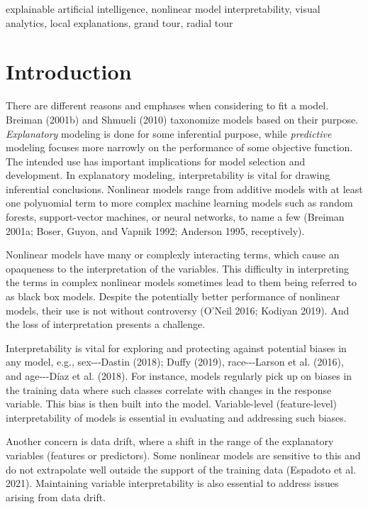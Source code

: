 \documentclass[11pt,twoside]{article}
\begin{document}
\begin{keywords}
explainable artificial intelligence, nonlinear model interpretability, visual analytics, local explanations, grand tour, radial tour
\end{keywords}


\hypertarget{sec:intro}{%
\section{Introduction}\label{sec:intro}}

There are different reasons and emphases when considering to fit a model. Breiman (2001b) and Shmueli (2010) taxonomize models based on their purpose. \emph{Explanatory} modeling is done for some inferential purpose, while \emph{predictive} modeling focuses more narrowly on the performance of some objective function. The intended use has important implications for model selection and development. In explanatory modeling, interpretability is vital for drawing inferential conclusions. Nonlinear models range from additive models with at least one polynomial term to more complex machine learning models such as random forests, support-vector machines, or neural networks, to name a few (Breiman 2001a; Boser, Guyon, and Vapnik 1992; Anderson 1995, receptively).

Nonlinear models have many or complexly interacting terms, which cause an opaqueness to the interpretation of the variables. This difficulty in interpreting the terms in complex nonlinear models sometimes lead to them being referred to as black box models. Despite the potentially better performance of nonlinear models, their use is not without controversy (O'Neil 2016; Kodiyan 2019). And the loss of interpretation presents a challenge.

Interpretability is vital for exploring and protecting against potential biases in any model, e.g., sex-\/-\/-Dastin (2018); Duffy (2019), race-\/-\/-Larson et al. (2016), and age-\/-\/-Díaz et al. (2018). For instance, models regularly pick up on biases in the training data where such classes correlate with changes in the response variable. This bias is then built into the model. Variable-level (feature-level) interpretability of models is essential in evaluating and addressing such biases.

Another concern is data drift, where a shift in the range of the explanatory variables (features or predictors). Some nonlinear models are sensitive to this and do not extrapolate well outside the support of the training data (Espadoto et al. 2021). Maintaining variable interpretability is also essential to address issues arising from data drift.
\end{document}
